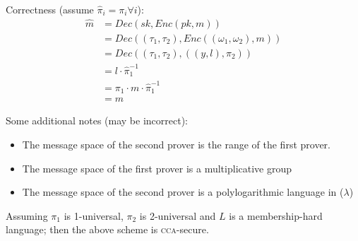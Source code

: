Correctness (assume $\hat{\pi}_i = \pi_i \forall i$):
\begin{align*}
    \hat{m} &= Dec(sk, Enc(pk, m)) \\
    &= Dec((\tau_1, \tau_2), Enc((\omega_1, \omega_2), m)) \\
    &= Dec((\tau_1, \tau_2), ((y, l), \pi_2)) \\
    &= l \cdot \hat{\pi}_1^{-1} \\
    &= \pi_1 \cdot m \cdot \hat{\pi}_1^{-1} \\
    &= m
\end{align*}

Some additional notes (may be incorrect):
\begin{itemize}
    \item The message space of the second prover is the range of the first prover.
    \item The message space of the first prover is a multiplicative group
    \item The message space of the second prover is a polylogarithmic language in ($\lambda$)
\end{itemize}





\begin{theorem}
    Assuming $\pi_1$ is 1-universal, $\pi_2$ is 2-universal and $L$ is a membership-hard language; then the above scheme is \textsc{cca}-secure.
\end{theorem}

